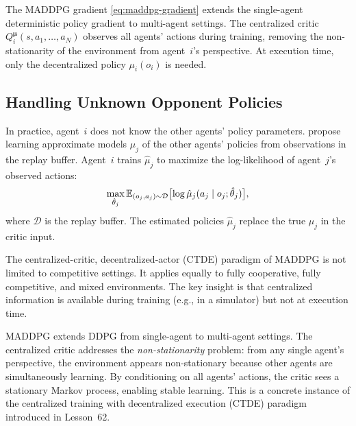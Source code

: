 \documentclass[11pt,a4paper]{article}
\begin{document}
\begin{keyresult}[title={MADDPG Policy Gradient}]
The MADDPG gradient \eqref{eq:maddpg-gradient} extends the single-agent
deterministic policy gradient to multi-agent settings.  The centralized
critic $Q_i^{\boldsymbol{\mu}}(s, a_1, \ldots, a_N)$ observes all
agents' actions during training, removing the non-stationarity of the
environment from agent~$i$'s perspective.  At execution time, only the
decentralized policy $\mu_i(o_i)$ is needed.
\end{keyresult}

\subsection{Handling Unknown Opponent Policies}

In practice, agent~$i$ does not know the other agents' policy
parameters.  \citet{lowe2017} propose learning approximate models
$\hat{\mu}_j$ of the other agents' policies from observations in the
replay buffer.  Agent~$i$ trains $\hat{\mu}_j$ to maximize the
log-likelihood of agent~$j$'s observed actions:
\begin{equation}
\label{eq:policy-inference}
  \max_{\hat{\theta}_j} \mathbb{E}_{(o_j, a_j) \sim \mathcal{D}}
  \bigl[ \log \hat{\mu}_j(a_j \mid o_j; \hat{\theta}_j) \bigr],
\end{equation}
where $\mathcal{D}$ is the replay buffer.  The estimated policies
$\hat{\mu}_j$ replace the true $\mu_j$ in the critic input.

\begin{remark}
The centralized-critic, decentralized-actor (CTDE) paradigm of MADDPG
is not limited to competitive settings.  It applies equally to fully
cooperative, fully competitive, and mixed environments.  The key insight
is that centralized information is available during training (e.g., in
a simulator) but not at execution time.
\end{remark}

\begin{rlconnection}
MADDPG extends DDPG \citep{lillicrap2016} from single-agent to
multi-agent settings.  The centralized critic addresses the
\emph{non-stationarity} problem: from any single agent's perspective,
the environment appears non-stationary because other agents are
simultaneously learning.  By conditioning on all agents' actions, the
critic sees a stationary Markov process, enabling stable learning.
This is a concrete instance of the centralized training with
decentralized execution (CTDE) paradigm introduced in Lesson~62.
\end{rlconnection}
\end{document}
